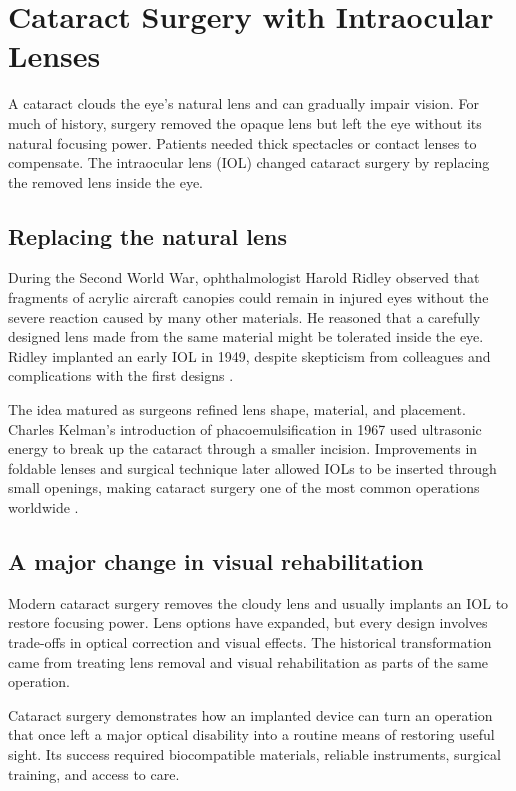 \documentclass[12pt,oneside]{book}
\begin{document}
\chapter[Cataract Surgery with Intraocular Lenses]{Cataract Surgery with Intraocular Lenses}

A cataract clouds the eye's natural lens and can gradually impair vision. For
much of history, surgery removed the opaque lens but left the eye without its
natural focusing power. Patients needed thick spectacles or contact lenses to
compensate. The intraocular lens (IOL) changed cataract surgery by replacing
the removed lens inside the eye.

\section{Replacing the natural lens}
During the Second World War, ophthalmologist Harold Ridley observed that fragments of acrylic aircraft canopies could remain in injured eyes without the severe reaction caused by many other materials. He reasoned that a carefully designed lens made from the same material might be tolerated inside the eye. Ridley implanted an early IOL in 1949, despite skepticism from colleagues and complications with the first designs \cite{neiCataractHistory}.

The idea matured as surgeons refined lens shape, material, and placement.
Charles Kelman's introduction of phacoemulsification in 1967 used ultrasonic
energy to break up the cataract through a smaller incision. Improvements in
foldable lenses and surgical technique later allowed IOLs to be inserted
through small openings, making cataract surgery one of the most common
operations worldwide \cite{cataractEvolution}.

\section{A major change in visual rehabilitation}
Modern cataract surgery removes the cloudy lens and usually implants an IOL to restore focusing power. Lens options have expanded, but every design involves trade-offs in optical correction and visual effects. The historical transformation came from treating lens removal and visual rehabilitation as parts of the same operation.

Cataract surgery demonstrates how an implanted device can turn an operation
that once left a major optical disability into a routine means of restoring
useful sight. Its success required biocompatible materials, reliable
instruments, surgical training, and access to care.
\end{document}
